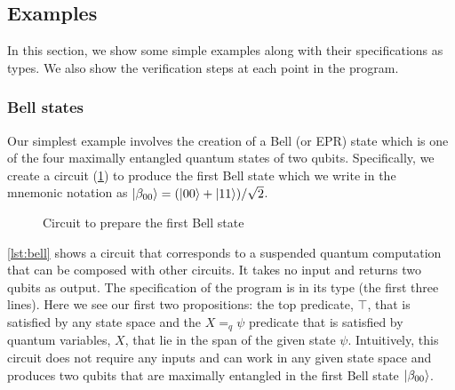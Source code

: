 \subsection{Examples}

In this section, we show some simple examples along with their specifications as types. We also show the verification steps at each point in the program.

\subsubsection{Bell states}

Our simplest example involves the creation of a Bell (or EPR) state which is one of the four maximally entangled quantum states of two qubits. Specifically, we create a circuit (\cref{fig:bell00}) to produce the first Bell state which we write in the mnemonic notation as $\ket{\beta_{00}} = (\ket{00}+\ket{11})/\sqrt{2}$.

\begin{figure}
    \centering
    \caption{Circuit to prepare the first Bell state}
    \label{fig:bell00}
\end{figure}





\cref{lst:bell} shows a circuit that corresponds to a suspended quantum computation that can be composed with other circuits. It takes no input and returns two qubits as output. The specification of the program is in its type (the first three lines). Here we see our first two propositions: the top predicate, $\top$, that is satisfied by any state space and the $X =_q \psi$ predicate that is satisfied by quantum variables, $X$, that lie in the span of the given state $\psi$. Intuitively, this circuit does not require any inputs and can work in any given state space and produces two qubits that are maximally entangled in the first Bell state $\ket{\beta_{00}}$.

